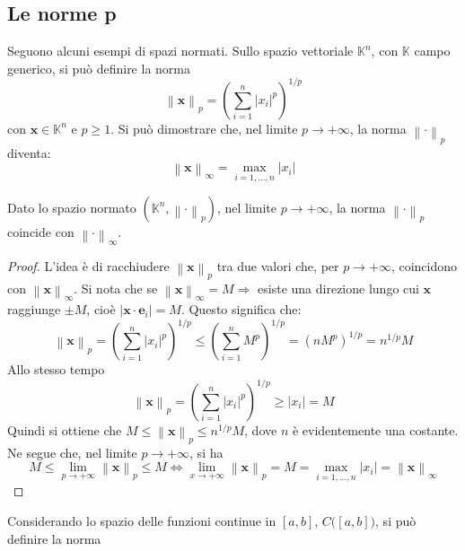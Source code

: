 \documentclass[11pt, a4paper]{scrartcl}
\theoremstyle{definition}
\numberwithin{esempio}{section}
\theoremstyle{definition}
\numberwithin{obs}{section}
\numberwithin{nota}{section}
\numberwithin{equation}{subsection}
\begin{document}
\subsection{Le norme p}
Seguono alcuni esempi di spazi normati.
Sullo spazio vettoriale $\mathbb{K}^n$, con $\mathbb{K}$ campo generico, si pu\`o definire la norma
\begin{equation}
	\left\lVert \mathbf{x}  \right\rVert _p = \left(\sum_{i=1}^{n} \lvert x_i \rvert ^p\right) ^{1 / p}
\end{equation}
\noindent con $\mathbf{x} \in \mathbb{K}^n$ e $p\ge 1$. 
Si pu\`o dimostrare che, nel limite $p \to +\infty$, la norma $\left\lVert \cdot  \right\rVert _p$ diventa:
\begin{equation}
	\left\lVert \mathbf{x}  \right\rVert _\infty = \max_{i=1,\ldots,n} \lvert x_i \rvert 
\end{equation}
\begin{prop}
	{}{}
	Dato lo spazio normato $(\mathbb{K}^n,\left\lVert \cdot  \right\rVert _p)$, nel limite $p\to +\infty$, la norma $\left\lVert \cdot  \right\rVert _p$ coincide con $\left\lVert \cdot  \right\rVert _\infty$.
	\begin{proof}
		L'idea \`e di racchiudere $\left\lVert \mathbf{x}  \right\rVert _p$ tra due valori che, per $p\to +\infty$, coincidono con $\left\lVert \mathbf{x}  \right\rVert _\infty$.
		Si nota che se $\left\lVert \mathbf{x}  \right\rVert _\infty = M \Rightarrow $ esiste una direzione lungo cui $\mathbf{x} $ raggiunge $\pm M$, cio\`e $|\mathbf{x} \cdot \mathbf{e} _i| = M$. 
		Questo significa che:
		\[
			\left\lVert \mathbf{x}  \right\rVert _p = \left(\sum_{i=1}^{n} \lvert x_i \rvert ^p\right) ^{1 / p} \le \left(\sum_{i=1}^{n} M^{p} \right) ^{1 / p} = \left(n M^p\right) ^{1 / p} = n^{1 / p} M
		\] 
		Allo stesso tempo 
		\[
		\left\lVert \mathbf{x}  \right\rVert _p = \left(\sum_{i=1}^{n} \lvert x _i\rvert ^p\right) ^{1 / p}  \ge \lvert x_i \rvert = M
		\] 
		Quindi si ottiene che $M \le \left\lVert \mathbf{x}  \right\rVert _p \le n^{1 / p} M$, dove $n$ \`e evidentemente una costante.
		Ne segue che, nel limite $p\to +\infty$, si ha 
		\[
		M\le \lim_{p \to +\infty} \left\lVert \mathbf{x}  \right\rVert _p \le  M \iff \lim_{x \to +\infty} \left\lVert \mathbf{x}  \right\rVert _p = M = \max_{i=1 ,\ldots, n} \lvert x_i \rvert = \left\lVert \mathbf{x}  \right\rVert _\infty
		\] 
	\end{proof}
\end{prop}
Considerando lo spazio delle funzioni continue in $[a,b]$, $C\big([a,b]\big)$, si pu\`o definire la norma
\end{document}

